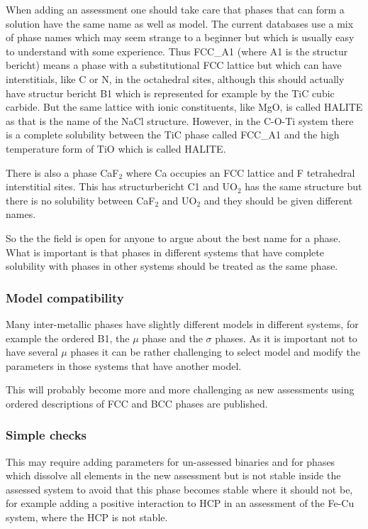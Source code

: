 \documentclass[12pt]{article}
\begin{document}
When adding an assessment one should take care that phases that can
form a solution have the same name as well as model.  The current
databases use a mix of phase names which may seem strange to a
beginner but which is usually easy to understand with some experience.
Thus FCC\_A1 (where A1 is the structur bericht) means a phase with a
substitutional FCC lattice but which can have interstitials, like C or
N, in the octahedral sites, although this should actually have
structur bericht B1 which is represented for example by the TiC cubic
carbide.  But the same lattice with ionic constituents, like MgO, is
called HALITE as that is the name of the NaCl structure.  However, in
the C-O-Ti system there is a complete solubility between the TiC phase
called FCC\_A1 and the high temperature form of TiO which is called
HALITE.

There is also a phase CaF$_2$ where Ca occupies an FCC lattice and F
tetrahedral interstitial sites.  This has structurbericht C1 and
UO$_2$ has the same structure but there is no solubility between
CaF$_2$ and UO$_2$ and they should be given different names.

So the the field is open for anyone to argue about the best name for a
phase.  What is important is that phases in different systems that
have complete solubility with phases in other systems should be
treated as the same phase.

\subsubsection{Model compatibility}

Many inter-metallic phases have slightly different models in different
systems, for example the ordered B1, the $\mu$ phase and the $\sigma$
phases.  As it is important not to have several $\mu$ phases it can be
rather challenging to select model and modify the parameters in those
systems that have another model.

This will probably become more and more challenging as new assessments
using ordered descriptions of FCC and BCC phases are published.

\subsubsection{Simple checks}

This may require adding parameters for un-assessed binaries and for
phases which dissolve all elements in the new assessment but is not
stable inside the assessed system to avoid that this phase becomes
stable where it should not be, for example adding a positive
interaction to HCP in an assessment of the Fe-Cu system, where the HCP
is not stable.
\end{document}
